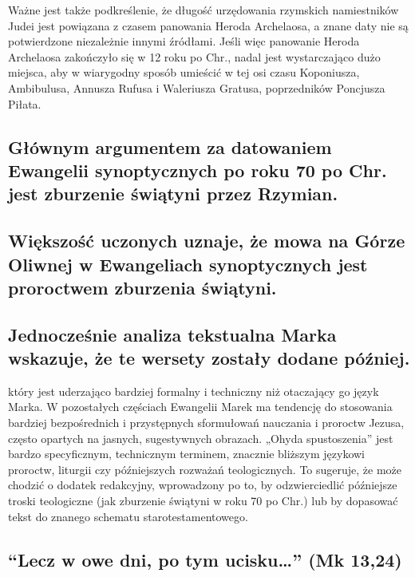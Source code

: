 Ważne jest także podkreślenie, że długość urzędowania rzymskich namiestników Judei jest powiązana z czasem panowania Heroda Archelaosa, a znane daty nie są potwierdzone niezależnie innymi źródłami.
Jeśli więc panowanie Heroda Archelaosa zakończyło się w 12 roku po Chr., nadal jest wystarczająco dużo miejsca, aby w wiarygodny sposób umieścić w tej osi czasu Koponiusza, Ambibulusa, Annusza Rufusa i Waleriusza Gratusa, poprzedników Poncjusza Piłata.

\subsection{Głównym argumentem za datowaniem Ewangelii synoptycznych po roku 70 po Chr. jest zburzenie świątyni przez Rzymian.}\label{subsec:the-main-argument-for-the-dating-of-the-synoptic-gospels-to-after-year-70ad-is-the-destruction-of-the-temple-by-the-romans.}

\subsection{Większość uczonych uznaje, że mowa na Górze Oliwnej w Ewangeliach synoptycznych jest proroctwem zburzenia świątyni.}\label{subsec:most-scholars-argue-the-olivet-discourse-in-the-synoptic-gospels-is-a-prophecy-of-the-destruction-of-the-temple.}

\subsection{Jednocześnie analiza tekstualna Marka wskazuje, że te wersety zostały dodane później.}\label{subsec:at-the-same-time-the-textual-analysis-of-mark-shows-that-these-verses-were-added-later.}

który jest uderzająco bardziej formalny i techniczny niż otaczający go język Marka.
W pozostałych częściach Ewangelii Marek ma tendencję do stosowania bardziej bezpośrednich i przystępnych sformułowań nauczania i proroctw Jezusa, często opartych na jasnych, sugestywnych obrazach.
„Ohyda spustoszenia” jest bardzo specyficznym, technicznym terminem, znacznie bliższym językowi proroctw, liturgii czy późniejszych rozważań teologicznych.
To sugeruje, że może chodzić o dodatek redakcyjny, wprowadzony po to, by odzwierciedlić późniejsze troski teologiczne (jak zburzenie świątyni w roku 70 po Chr.) lub by dopasować tekst do znanego schematu starotestamentowego.

\subsection{\texorpdfstring{``Lecz w owe dni, po tym ucisku\ldots{}'' (Mk 13,24)}{4.
``But in those days, after that tribulation\ldots'' (Mark 13:24)}}\label{subsec:but-in-those-days-after-that-tribulation-mark-1324}

